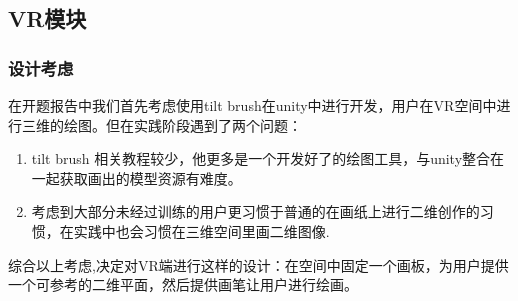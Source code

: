 \documentclass{article}
\begin{document}
\subsection{VR模块}
\subsubsection{设计考虑}
在开题报告中我们首先考虑使用tilt brush在unity中进行开发，用户在VR空间中进行三维的绘图。但在实践阶段遇到了两个问题：
\begin{enumerate}
    \item tilt brush 相关教程较少，他更多是一个开发好了的绘图工具，与unity整合在一起获取画出的模型资源有难度。
    \item 考虑到大部分未经过训练的用户更习惯于普通的在画纸上进行二维创作的习惯，在实践中也会习惯在三维空间里画二维图像.
\end{enumerate}

综合以上考虑,决定对VR端进行这样的设计：在空间中固定一个画板，为用户提供一个可参考的二维平面，然后提供画笔让用户进行绘画。
\end{document}
